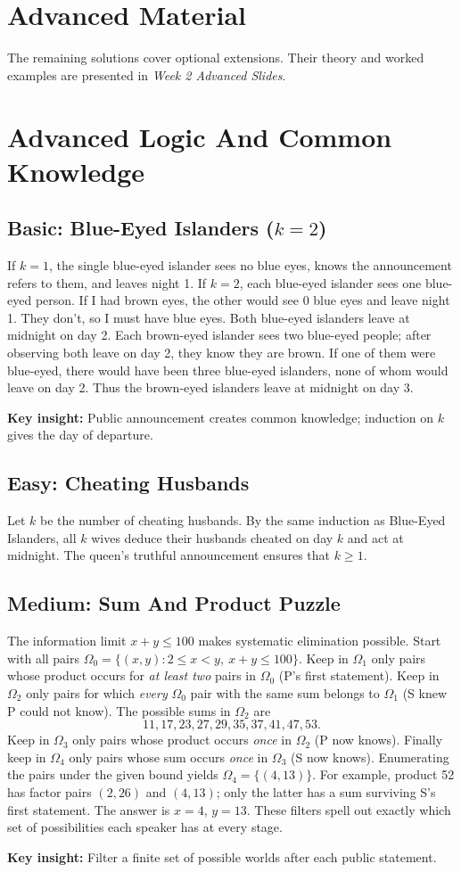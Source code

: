 \documentclass[12pt]{article}
\newcommand{\insight}[1]{\par\medskip\noindent\textbf{Key insight:} #1}
\begin{document}
\newpage
\section*{Advanced Material}
The remaining solutions cover optional extensions. Their theory and
worked examples are presented in \textit{Week 2 Advanced Slides}.

\section{Advanced Logic And Common Knowledge}

\subsection*{Basic: Blue-Eyed Islanders ($k=2$)}
If $k=1$, the single blue-eyed islander sees no blue eyes, knows the
announcement refers to them, and leaves night 1.
If $k=2$, each blue-eyed islander sees one blue-eyed person. If I had
brown eyes, the other would see 0 blue eyes and leave night 1. They
don't, so I must have blue eyes. Both blue-eyed islanders leave at
midnight on day 2. Each brown-eyed islander sees two blue-eyed people;
after observing both leave on day 2, they know they are brown. If one
of them were blue-eyed, there would have been three blue-eyed
islanders, none of whom would leave on day 2. Thus the brown-eyed
islanders leave at midnight on day 3.
\insight{Public announcement creates common knowledge; induction on
$k$ gives the day of departure.}

\subsection*{Easy: Cheating Husbands}
Let $k$ be the number of cheating husbands. By the same induction as
Blue-Eyed Islanders, all $k$ wives deduce their husbands cheated on
day $k$ and act at midnight. The queen's truthful announcement
ensures that $k\ge1$.

\subsection*{Medium: Sum And Product Puzzle}
The information limit $x+y\le100$ makes systematic elimination
possible. Start with all pairs
$\Omega_0=\{(x,y):2\le x<y,\ x+y\le100\}$. Keep in $\Omega_1$
only pairs whose product occurs for \emph{at least two} pairs in
$\Omega_0$ (P's first statement). Keep in $\Omega_2$ only pairs for
which \emph{every} $\Omega_0$ pair with the same sum belongs to
$\Omega_1$ (S knew P could not know). The possible sums in
$\Omega_2$ are
\[
11,17,23,27,29,35,37,41,47,53.
\]
Keep in $\Omega_3$ only pairs whose product occurs \emph{once} in
$\Omega_2$ (P now knows). Finally keep in $\Omega_4$ only pairs
whose sum occurs \emph{once} in $\Omega_3$ (S now knows). Enumerating
the pairs under the given bound yields $\Omega_4=\{(4,13)\}$.
For example, product 52 has factor pairs $(2,26)$ and $(4,13)$;
only the latter has a sum surviving S's first statement. The answer
is $x=4$, $y=13$. These filters spell out exactly which set of
possibilities each speaker has at every stage.
\insight{Filter a finite set of possible worlds after each public statement.}
\end{document}
